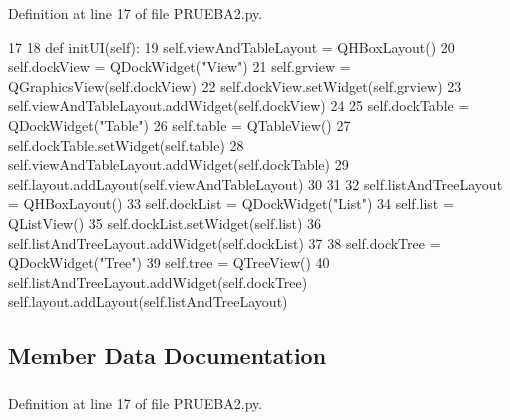 \-Definition at line 17 of file \-P\-R\-U\-E\-B\-A2.\-py.


\begin{DoxyCode}
17 
18     def initUI(self):
19         self.viewAndTableLayout = QHBoxLayout()
20         self.dockView = QDockWidget("View")
21         self.grview = QGraphicsView(self.dockView)
22         self.dockView.setWidget(self.grview)
23         self.viewAndTableLayout.addWidget(self.dockView)
24  
25         self.dockTable = QDockWidget("Table")
26         self.table = QTableView()
27         self.dockTable.setWidget(self.table)
28         self.viewAndTableLayout.addWidget(self.dockTable)
29         self.layout.addLayout(self.viewAndTableLayout)
30  
31  
32         self.listAndTreeLayout = QHBoxLayout()
33         self.dockList = QDockWidget("List")
34         self.list = QListView()
35         self.dockList.setWidget(self.list)
36         self.listAndTreeLayout.addWidget(self.dockList)
37  
38         self.dockTree = QDockWidget("Tree")
39         self.tree = QTreeView()
40         self.listAndTreeLayout.addWidget(self.dockTree)
        self.layout.addLayout(self.listAndTreeLayout)
\end{DoxyCode}


\subsection{\-Member \-Data \-Documentation}
\subsubsection[{dock\-List}]{}\label{classpruebas_1_1_p_r_u_e_b_a2_1_1_example_aa105805e3a1fa5b65667547372fcaae3}


\-Definition at line 17 of file \-P\-R\-U\-E\-B\-A2.\-py.

\subsubsection[{dock\-Table}]{}\label{classpruebas_1_1_p_r_u_e_b_a2_1_1_example_a75e7df632ddd95619832dec0d9e1ca69}


